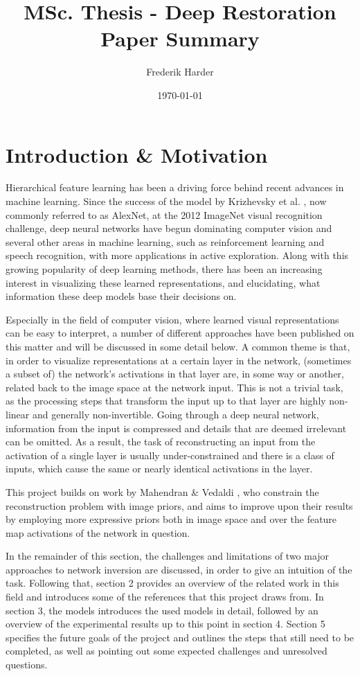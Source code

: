 \documentclass{article}
\title{MSc. Thesis - Deep Restoration\\Paper Summary}
\date{\today}
\author{Frederik Harder}
\begin{document}
\maketitle

\section{Introduction \& Motivation}


Hierarchical feature learning has been a driving force behind recent advances in machine learning. Since the success of the model by Krizhevsky et al. \cite{alexnet}, now commonly referred to as AlexNet, at the 2012 ImageNet visual recognition challenge, deep neural networks have begun dominating computer vision and several other areas in machine learning, such as reinforcement learning and speech recognition, with more applications in active exploration. Along with this growing popularity of deep learning methods, there has been an increasing interest in visualizing these learned representations, and elucidating, what information these deep models base their decisions on. 

Especially in the field of computer vision, where learned visual representations can be easy to interpret, a number of different approaches have been published on this matter and will be discussed in some detail below. A common theme is that, in order to visualize representations at a certain layer in the network, (sometimes a subset of) the network's activations in that layer are, in some way or another, related back to the image space at the network input. This is not a trivial task, as the processing steps that transform the input up to that layer are highly non-linear and generally non-invertible. Going through a deep neural network, information from the input is compressed and details that are deemed irrelevant can be omitted. As a result, the task of reconstructing an input from the activation of a single layer is usually under-constrained and there is a class of inputs, which cause the same or nearly identical activations in the layer.

This project builds on work by Mahendran \& Vedaldi \cite{mv15, mv16}, who constrain the reconstruction problem with image priors, and aims to improve upon their results by employing more expressive priors both in image space and over the feature map activations of the network in question.

In the remainder of this section, the challenges and limitations of two major approaches to network inversion are discussed, in order to give an intuition of the task. Following that, section 2 provides an overview of the related work in this field and introduces some of the references that this project draws from. In section 3, the models introduces the used models in detail, followed by an overview of the experimental results up to this point in section 4. Section 5 specifies the future goals of the project and outlines the steps that still need to be completed, as well as pointing out some expected challenges and unresolved questions.
\end{document}
